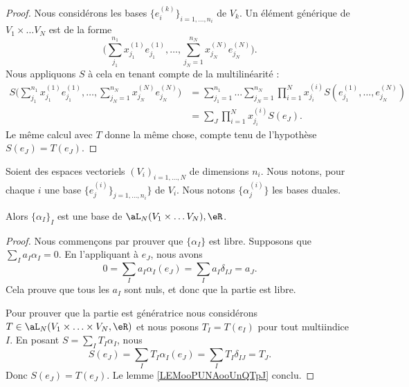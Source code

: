 \begin{proof}
	Nous considérons les bases \( \{ e^{(k)}_i \}_{i=1,\ldots,n_i}\) de \( V_k\). Un élément générique de \( V_1\times \ldots V_N\) est de la forme
	\begin{equation}
		\Big(  \sum_{j_1}^{n_1}x_{j_1}^{(1)}e^{(1)}_{j_1},\ldots, \sum_{j_N=1}^{n_N}x_{j_N}^{(N)}e_{j_N}^{(N)} \Big).
	\end{equation}
	Nous appliquons \( S\) à cela en tenant compte de la multilinéarité :
	\begin{subequations}
		\begin{align}
			S\Big(  \sum_{j_1}^{n_1}x_{j_1}^{(1)}e^{(1)}_{j_1},\ldots, \sum_{j_N=1}^{n_N}x_{j_N}^{(N)}e_{j_N}^{(N)} \Big) & =\sum_{j_1=1}^{n_1}\ldots \sum_{j_N=1}^{n_N}\prod_{i=1}^Nx_{j_i}^{(i)}S(e^{(1)}_{j_1},\ldots,e_{j_N}^{(N)}) \\
			                                                                                                              & =\sum_J\prod_{i=1}^Nx_{j_i}^{(i)}S(e_J).
		\end{align}
	\end{subequations}
	Le même calcul avec \( T\) donne la même chose, compte tenu de l'hypothèse \( S(e_J)=T(e_J)\).
\end{proof}

\begin{theorem}		\label{THOooTAGKooDscwFG}
	Soient des espaces vectoriels \( (V_i)_{i=1,\ldots,N}\) de dimensions \( n_i\). Nous notons, pour chaque \( i\) une base \( \{ e_j^{(i)}\}_{j=1,\ldots,n_i} \} \) de \( V_i\). Nous notons \( \{ \alpha_j^{(i)} \}\) les bases duales.

	Alors \( \{ \alpha_I \}_I\) est une base de \( \aL_N(V_1\times \ldots V_N),\eR\).
\end{theorem}

\begin{proof}
	Nous commençons par prouver que \( \{ \alpha_I \}\) est libre. Supposons que \( \sum_Ia_I\alpha_I=0\). En l'appliquant à \( e_J\), nous avons
	\begin{equation}
		0=\sum_Ia_I\alpha_I(e_J)=\sum_{I}a_I\delta_{IJ}=a_J.
	\end{equation}
	Cela prouve que tous les \( a_I\) sont nuls, et donc que la partie est libre.

	Pour prouver que la partie est génératrice nous considérons \( T\in \aL_N(V_1\times\ldots\times V_N,\eR)\) et nous posons \( T_I=T(e_I)\) pour tout multiindice \( I\). En posant \( S=\sum_IT_I\alpha_I\), nous
	\begin{equation}
		S(e_J)=\sum_{I}T_I\alpha_I(e_J)=\sum_IT_I\delta_{IJ}=T_J.
	\end{equation}
	Donc \( S(e_J)=T(e_J)\). Le lemme \ref{LEMooPUNAooUnQTpJ} conclu.
\end{proof}

